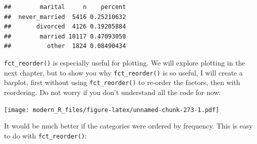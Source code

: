 \documentclass[]{gitbook}
\newenvironment{Shaded}{\begin{snugshade}}{\end{snugshade}}
\newcommand{\DataTypeTok}[1]{\textcolor[rgb]{0.13,0.29,0.53}{#1}}
\newcommand{\FloatTok}[1]{\textcolor[rgb]{0.00,0.00,0.81}{#1}}
\newcommand{\KeywordTok}[1]{\textcolor[rgb]{0.13,0.29,0.53}{\textbf{#1}}}
\newcommand{\NormalTok}[1]{#1}
\newcommand{\OperatorTok}[1]{\textcolor[rgb]{0.81,0.36,0.00}{\textbf{#1}}}
\newcommand{\OtherTok}[1]{\textcolor[rgb]{0.56,0.35,0.01}{#1}}
\newcommand{\StringTok}[1]{\textcolor[rgb]{0.31,0.60,0.02}{#1}}
\theoremstyle{definition}
\theoremstyle{definition}
\theoremstyle{definition}
\theoremstyle{remark}
\begin{document}
\begin{Shaded}
\end{Shaded}

\begin{verbatim}
##        marital     n    percent
##  never_married  5416 0.25210632
##       divorced  4126 0.19205884
##        married 10117 0.47093050
##          other  1824 0.08490434
\end{verbatim}

\texttt{fct\_reorder()} is especially useful for plotting. We will
explore plotting in the next chapter, but to show you why
\texttt{fct\_reorder()} is so useful, I will create a barplot, first
without using \texttt{fct\_reorder()} to re-order the factors, then with
reordering. Do not worry if you don't understand all the code for now:

\begin{Shaded}
\end{Shaded}

\texttt{[image: modern\_R\_files/figure-latex/unnamed-chunk-273-1.pdf]}

It would be much better if the categories were ordered by frequency.
This is easy to do with \texttt{fct\_reorder()}:

\begin{Shaded}
\end{Shaded}
\end{document}
